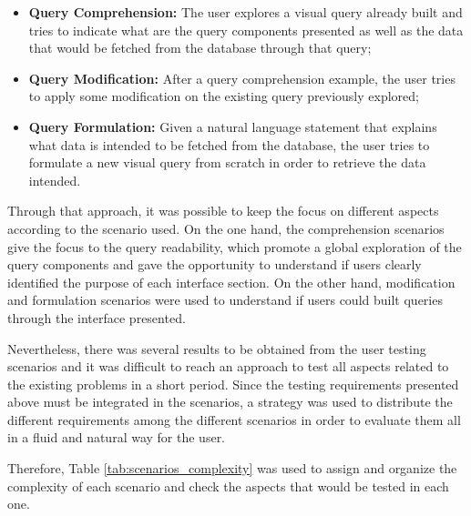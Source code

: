 \begin{itemize}
    \item \textbf{Query Comprehension: } The user explores a visual query already built and tries to indicate what are the query components presented as well as the data that would be fetched from the database through that query;
    \item \textbf{Query Modification: } After a query comprehension example, the user tries to apply some modification on the existing query previously explored;
    \item \textbf{Query Formulation: } Given a natural language statement that explains what data is intended to be fetched from the database, the user tries to formulate a new visual query from scratch in order to retrieve the data intended.
\end{itemize}

Through that approach, it was possible to keep the focus on different aspects according to the scenario used. On the one hand, the comprehension scenarios give the focus to the query readability, which promote a global exploration of the query components and gave the opportunity to understand if users clearly identified the purpose of each interface section. On the other hand, modification and formulation scenarios were used to understand if users could built queries through the interface presented.

Nevertheless, there was several results to be obtained from the user testing scenarios and it was difficult to reach an approach to test all aspects related to the existing problems in a short period. Since the testing requirements presented above must be integrated in the scenarios, a strategy was used to distribute the different requirements among the different scenarios in order to evaluate them all in a fluid and natural way for the user. 


Therefore, Table \ref{tab:scenarios_complexity} was used to assign and organize the complexity of each scenario and check the aspects that would be tested in each one.

